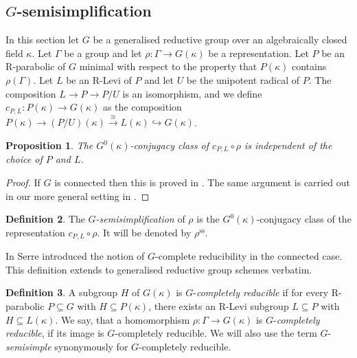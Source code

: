 \documentclass{amsart}
\newtheorem{prop}{Proposition}[section]
\theoremstyle{definition}
\newtheorem{defi}[prop]{Definition}
\theoremstyle{remark}
\newcommand{\semi}{\mathrm{ss}}
\begin{document}
\subsection{\texorpdfstring{$G$-semisimplification}{G-semisimplification}}
\label{sec_G_ss}

In this section let $G$ be a generalised reductive group over an algebraically closed field $\kappa$. 
Let $\Gamma$ be a group and let $\rho: \Gamma \rightarrow G(\kappa)$ be a representation.
Let $P$ be an R-parabolic of $G$ minimal with respect to the property that $P(\kappa)$ contains $\rho(\Gamma)$. 
Let $L$ be an R-Levi of $P$ and let $U$ be the unipotent radical of $P$. The composition $L\rightarrow P\rightarrow P/U$ is an isomorphism, and we define $c_{P,L}: P(\kappa)\rightarrow G(\kappa)$ as the 
composition $P(\kappa)\rightarrow (P/U)(\kappa)\overset{\cong}{\longrightarrow} L(\kappa)\hookrightarrow G(\kappa)$.

\begin{prop}\label{indepofPL} The $G^0(\kappa)$-conjugacy class of $c_{P,L} \circ \rho$ is independent of the choice 
of $P$ and $L$.
\end{prop}
\begin{proof} If $G$ is connected then this is proved in \cite[Proposition 3.3 (b)]{serre_complete_red}.
The same argument is carried out in our more general setting in \cite[Proposition 2.15]{quast}.
\end{proof} 

\begin{defi}\label{defi_G_ss} The \emph{$G$-semisimplification} of $\rho$ is the $G^0(\kappa)$-conjugacy class of the representation $c_{P,L} \circ \rho$. It will be denoted by $\rho^{\semi}$.
\end{defi}


In \cite[Section 3.2.1]{serre_complete_red} Serre introduced the notion of $G$-complete reducibility in the connected case. This definition extends to generalised reductive group schemes verbatim.

 \begin{defi}\label{defi_Gcr} A subgroup $H$ of $G(\kappa)$ is $G$-\emph{completely reducible} if for every R-parabolic $P \subseteq G$ with $H \subseteq P (\kappa)$, there exists an R-Levi subgroup $L \subseteq P$ with $H \subseteq L(\kappa)$. We say, that a homomorphism $\rho:\Gamma \rightarrow G(\kappa)$ is $G$-\emph{completely reducible}, if its image is 
 $G$-completely reducible. We will also use the term $G$-\emph{semisimple} synonymously for $G$-completely reducible. 
 \end{defi}
\end{document}
